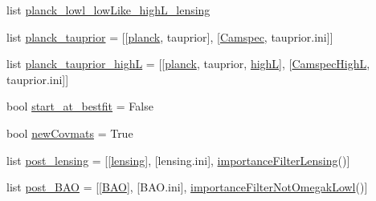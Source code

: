 \begin{DoxyCompactItemize}
\item 
list \mbox{\hyperlink{namespaceplanck_1_1settings__planck__nominal_ad81ef316362f713aebb7a7a18deea126}{planck\+\_\+lowl\+\_\+low\+Like\+\_\+high\+L\+\_\+lensing}}
\item 
list \mbox{\hyperlink{namespaceplanck_1_1settings__planck__nominal_a3aee2a0588239b97b936c48b57d08fff}{planck\+\_\+tauprior}} = \mbox{[}\mbox{[}\mbox{\hyperlink{namespaceplanck_1_1settings__planck__nominal_a6f1ef8e232b47d87b6d83ec17c539b60}{planck}}, \textquotesingle{}tauprior\textquotesingle{}\mbox{]}, \mbox{[}\mbox{\hyperlink{namespaceplanck_1_1settings__planck__nominal_abe836cf536af620f0c0b86090b4155b9}{Camspec}}, \textquotesingle{}tauprior.\+ini\textquotesingle{}\mbox{]}\mbox{]}
\item 
list \mbox{\hyperlink{namespaceplanck_1_1settings__planck__nominal_ab1535ae773cae1354af91e34b6b0e918}{planck\+\_\+tauprior\+\_\+highL}} = \mbox{[}\mbox{[}\mbox{\hyperlink{namespaceplanck_1_1settings__planck__nominal_a6f1ef8e232b47d87b6d83ec17c539b60}{planck}}, \textquotesingle{}tauprior\textquotesingle{}, \mbox{\hyperlink{namespaceplanck_1_1settings__planck__nominal_a2149979f1abc79475e000b828812fafb}{highL}}\mbox{]}, \mbox{[}\mbox{\hyperlink{namespaceplanck_1_1settings__planck__nominal_aa2ae616c3b4aa7481497a1ee554915b8}{Camspec\+HighL}}, \textquotesingle{}tauprior.\+ini\textquotesingle{}\mbox{]}\mbox{]}
\item 
bool \mbox{\hyperlink{namespaceplanck_1_1settings__planck__nominal_af79d09b43fcf03f23a53b1056e3b7d86}{start\+\_\+at\+\_\+bestfit}} = False
\item 
bool \mbox{\hyperlink{namespaceplanck_1_1settings__planck__nominal_a013682ef6fbd2870da493e85b48855aa}{new\+Covmats}} = True
\item 
list \mbox{\hyperlink{namespaceplanck_1_1settings__planck__nominal_ac1fba7046d21528a48ff405fe4448c0a}{post\+\_\+lensing}} = \mbox{[}\mbox{[}\mbox{\hyperlink{namespaceplanck_1_1settings__planck__nominal_af5d53197b39015efa5b5f44b1d8215b1}{lensing}}\mbox{]}, \mbox{[}\textquotesingle{}lensing.\+ini\textquotesingle{}\mbox{]}, \mbox{\hyperlink{classplanck_1_1settings__planck__nominal_1_1importanceFilterLensing}{importance\+Filter\+Lensing}}()\mbox{]}
\item 
list \mbox{\hyperlink{namespaceplanck_1_1settings__planck__nominal_aa01d97596bf56fc5158fc747690164e1}{post\+\_\+\+B\+AO}} = \mbox{[}\mbox{[}\mbox{\hyperlink{namespaceplanck_1_1settings__planck__nominal_adb348a01bf054af06b580f1735df8de2}{B\+AO}}\mbox{]}, \mbox{[}\textquotesingle{}B\+A\+O.\+ini\textquotesingle{}\mbox{]}, \mbox{\hyperlink{classplanck_1_1settings__planck__nominal_1_1importanceFilterNotOmegakLowl}{importance\+Filter\+Not\+Omegak\+Lowl}}()\mbox{]}

\end{DoxyCompactItemize}
